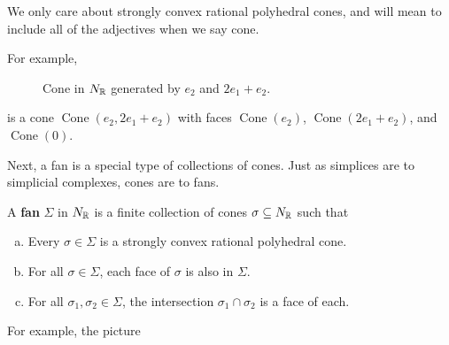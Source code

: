 \documentclass[12pt]{article}
\DeclareMathOperator{\Cone}{Cone}
\begin{document}
We only care about strongly convex rational polyhedral cones, and will mean to include all of the adjectives when we say cone.

For example,

\begin{figure}[H]
\centering
{}
\caption{Cone in $N_{\mathbb{R}}$ generated by $e_2$ and $2e_1 + e_2$.}
\end{figure}
is a cone $\Cone(e_2,2e_1+e_2)$ with faces $\Cone(e_2)$, $\Cone(2e_1+e_2)$, and $\Cone(0)$.

Next, a fan is a special type of collections of cones. Just as simplices are to simplicial complexes, cones are to fans.

\begin{defn}
    A \textbf{fan} $\Sigma$ in $N_{\mathbb{R}}$ is a finite collection of cones $\sigma \subseteq N_{\mathbb{R}}$ such that
    \begin{enumerate}[(a)]
        \item Every $\sigma\in \Sigma$ is a strongly convex rational polyhedral cone.
        \item For all $\sigma \in \Sigma$, each face of $\sigma$ is also in $\Sigma$.
        \item For all $\sigma_1,\sigma_2 \in \Sigma$, the intersection $\sigma_1 \cap \sigma_2$ is a face of each.
    \end{enumerate}
\end{defn}

For example, the picture
\end{document}

